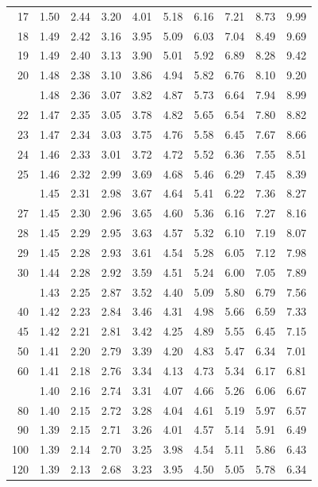 \documentclass[10pt]{article}
\begin{document}
\begin{longtable}{@{}r!{\vrule width 0.8pt\hspace{0.55em}}rrrrrrrrr@{}}
17 & 1.50 & 2.44 & 3.20 & 4.01 & 5.18 & 6.16 & 7.21 & 8.73 & 9.99 \\
18 & 1.49 & 2.42 & 3.16 & 3.95 & 5.09 & 6.03 & 7.04 & 8.49 & 9.69 \\
19 & 1.49 & 2.40 & 3.13 & 3.90 & 5.01 & 5.92 & 6.89 & 8.28 & 9.42 \\
20 & 1.48 & 2.38 & 3.10 & 3.86 & 4.94 & 5.82 & 6.76 & 8.10 & 9.20 \\
 & 1.48 & 2.36 & 3.07 & 3.82 & 4.87 & 5.73 & 6.64 & 7.94 & 8.99 \\
22 & 1.47 & 2.35 & 3.05 & 3.78 & 4.82 & 5.65 & 6.54 & 7.80 & 8.82 \\
23 & 1.47 & 2.34 & 3.03 & 3.75 & 4.76 & 5.58 & 6.45 & 7.67 & 8.66 \\
24 & 1.46 & 2.33 & 3.01 & 3.72 & 4.72 & 5.52 & 6.36 & 7.55 & 8.51 \\
25 & 1.46 & 2.32 & 2.99 & 3.69 & 4.68 & 5.46 & 6.29 & 7.45 & 8.39 \\
 & 1.45 & 2.31 & 2.98 & 3.67 & 4.64 & 5.41 & 6.22 & 7.36 & 8.27 \\
27 & 1.45 & 2.30 & 2.96 & 3.65 & 4.60 & 5.36 & 6.16 & 7.27 & 8.16 \\
28 & 1.45 & 2.29 & 2.95 & 3.63 & 4.57 & 5.32 & 6.10 & 7.19 & 8.07 \\
29 & 1.45 & 2.28 & 2.93 & 3.61 & 4.54 & 5.28 & 6.05 & 7.12 & 7.98 \\
30 & 1.44 & 2.28 & 2.92 & 3.59 & 4.51 & 5.24 & 6.00 & 7.05 & 7.89 \\
 & 1.43 & 2.25 & 2.87 & 3.52 & 4.40 & 5.09 & 5.80 & 6.79 & 7.56 \\
40 & 1.42 & 2.23 & 2.84 & 3.46 & 4.31 & 4.98 & 5.66 & 6.59 & 7.33 \\
45 & 1.42 & 2.21 & 2.81 & 3.42 & 4.25 & 4.89 & 5.55 & 6.45 & 7.15 \\
50 & 1.41 & 2.20 & 2.79 & 3.39 & 4.20 & 4.83 & 5.47 & 6.34 & 7.01 \\
60 & 1.41 & 2.18 & 2.76 & 3.34 & 4.13 & 4.73 & 5.34 & 6.17 & 6.81 \\
 & 1.40 & 2.16 & 2.74 & 3.31 & 4.07 & 4.66 & 5.26 & 6.06 & 6.67 \\
80 & 1.40 & 2.15 & 2.72 & 3.28 & 4.04 & 4.61 & 5.19 & 5.97 & 6.57 \\
90 & 1.39 & 2.15 & 2.71 & 3.26 & 4.01 & 4.57 & 5.14 & 5.91 & 6.49 \\
100 & 1.39 & 2.14 & 2.70 & 3.25 & 3.98 & 4.54 & 5.11 & 5.86 & 6.43 \\
120 & 1.39 & 2.13 & 2.68 & 3.23 & 3.95 & 4.50 & 5.05 & 5.78 & 6.34 \\

\end{longtable}
\end{document}
